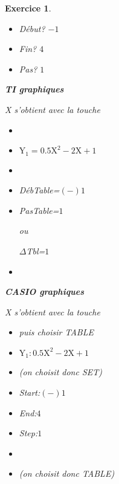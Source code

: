 \documentclass[10pt]{article}
\newtheorem{exo}{Exercice}
\begin{document}
\begin{exo}
\begin{enumerate}
\begin{multicols}{3}
\begin{itemize}
(si on demande g(X)=, ne rien rentrer)
\item[\textbullet] Début? $-1$ 
\item[\textbullet] Fin? $4$ 
\item[\textbullet] Pas? $1$ 
\end{itemize}





\columnbreak

\begin{center}
\textbf{TI graphiques}
\end{center}

X s'obtient avec la touche 
\begin{itemize}
\item[\textbullet] 
\item[\textbullet] $\text{Y}_1=0.5\text{X}^2-2\text{X}+1$ 
\item[\textbullet]  
\item[\textbullet] DébTable=$(-)1$ 
\item[\textbullet] PasTable=$1$ 

ou

\tiny{$\Delta$}\normalsize Tbl=$1$ 
\item[\textbullet]  
\end{itemize}


\columnbreak

\begin{center}
\textbf{CASIO graphiques}
\end{center}

X s'obtient avec la touche 
\begin{itemize}
\item[\textbullet]  puis choisir TABLE 
\item[\textbullet] $\text{Y}_1:0.5\text{X}^2-2\text{X}+1$ 
\item[\textbullet]  (on choisit donc SET)
\item[\textbullet] Start:$(-)1$ 
\item[\textbullet] End:$4$ 
\item[\textbullet] Step:$1$ 
\item[\textbullet]
\item[\textbullet]  (on choisit donc TABLE)
\end{itemize}



\end{multicols}
\end{enumerate}
\end{exo}
\end{document}
